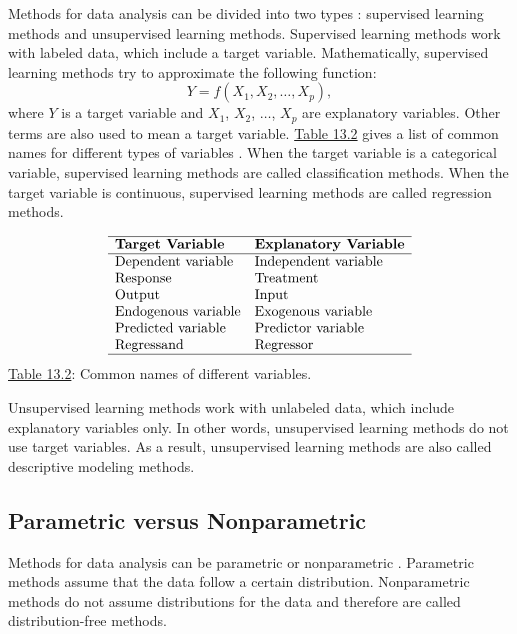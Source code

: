 \documentclass[]{book}
\theoremstyle{definition}
\theoremstyle{definition}
\theoremstyle{definition}
\theoremstyle{remark}
\begin{document}
Methods for data analysis can be divided into two types
\citep{abbott2014, igual2017}: supervised learning methods and
unsupervised learning methods. Supervised learning methods work with
labeled data, which include a target variable. Mathematically,
supervised learning methods try to approximate the following function:
\[
Y = f(X_1, X_2, \ldots, X_p),
\] where \(Y\) is a target variable and \(X_1\), \(X_2\), \(\ldots\),
\(X_p\) are explanatory variables. Other terms are also used to mean a
target variable. \protect\hyperlink{tab:13.2}{Table 13.2} gives a list
of common names for different types of variables \citep{frees2009}. When
the target variable is a categorical variable, supervised learning
methods are called classification methods. When the target variable is
continuous, supervised learning methods are called regression methods.

\[\begin{matrix}
\begin{array}{ll}
\hline
\textbf{Target Variable}  &  \textbf{Explanatory Variable}\\\hline
\text{Dependent variable} & \text{Independent variable}\\
\text{Response} & \text{Treatment} \\
\text{Output} & \text{Input} \\
\text{Endogenous variable} & \text{Exogenous variable} \\
\text{Predicted variable} & \text{Predictor variable} \\
\text{Regressand} & \text{Regressor} \\
\hline
\end{array}
\end{matrix}
\] \protect\hyperlink{tab:13.2}{Table 13.2}: Common names of different
variables.

Unsupervised learning methods work with unlabeled data, which include
explanatory variables only. In other words, unsupervised learning
methods do not use target variables. As a result, unsupervised learning
methods are also called descriptive modeling methods.

\subsection{Parametric versus
Nonparametric}\label{parametric-versus-nonparametric}

Methods for data analysis can be parametric or nonparametric
\citep{abbott2014}. Parametric methods assume that the data follow a
certain distribution. Nonparametric methods do not assume distributions
for the data and therefore are called distribution-free methods.
\end{document}
